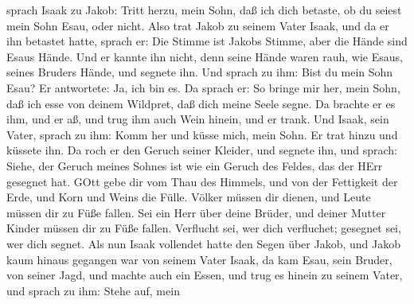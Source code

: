 sprach Isaak zu Jakob: Tritt herzu, mein Sohn, daß ich dich betaste, ob du seiest mein Sohn Esau, oder nicht. Also trat Jakob zu seinem Vater Isaak, und da er ihn betastet hatte, sprach er: Die Stimme ist Jakobs Stimme, aber die Hände sind Esaus Hände. Und er kannte ihn nicht, denn seine Hände waren rauh, wie Esaus, seines Bruders Hände, und segnete ihn. Und sprach zu ihm: Bist du mein Sohn Esau? Er antwortete: Ja, ich bin es. Da sprach er: So bringe mir her, mein Sohn, daß ich esse von deinem Wildpret, daß dich meine Seele segne. Da brachte er es ihm, und er aß, und trug ihm auch Wein hinein, und er trank. Und Isaak, sein Vater, sprach zu ihm: Komm her und küsse mich, mein Sohn. Er trat hinzu und küssete ihn. Da roch er den Geruch seiner Kleider, und segnete ihn, und sprach: Siehe, der Geruch meines Sohnes ist wie ein Geruch des Feldes, das der HErr gesegnet hat. GOtt gebe dir vom Thau des Himmels, und von der Fettigkeit der Erde, und Korn und Weins die Fülle. Völker müssen dir dienen, und Leute müssen dir zu Füße fallen. Sei ein Herr über deine Brüder, und deiner Mutter Kinder müssen dir zu Füße fallen. Verflucht sei, wer dich verfluchet; gesegnet sei, wer dich segnet. Als nun Isaak vollendet hatte den Segen über Jakob, und Jakob kaum hinaus gegangen war von seinem Vater Isaak, da kam Esau, sein Bruder, von seiner Jagd, und machte auch ein Essen, und trug es hinein zu seinem Vater, und sprach zu ihm: Stehe auf, mein
